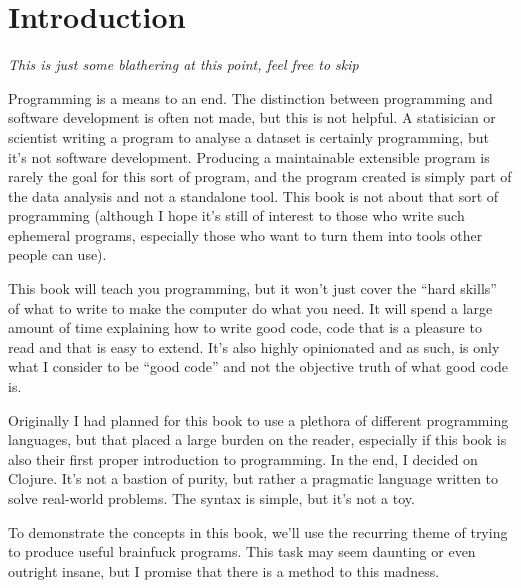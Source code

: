 \chapter{Introduction}

{\em This is just some blathering at this point, feel free to skip}

Programming is a means to an end. The distinction between programming
and software development is often not made, but this is not helpful.
A statisician or scientist writing a program to analyse a dataset is
certainly programming, but it's not software development.  Producing a
maintainable extensible program is rarely the goal for this sort of
program, and the program created is simply part of the data analysis
and not a standalone tool. This book is not about that sort of
programming (although I hope it's still of interest to those who write
such ephemeral programs, especially those who want to turn them into
tools other people can use).

This book will teach you programming, but it won't just cover the
``hard skills'' of what to write to make the computer do what you
need.  It will spend a large amount of time explaining how to write
good code, code that is a pleasure to read and that is easy to extend.
It's also highly opinionated and as such, is only what I consider to
be ``good code'' and not the objective truth of what good code is.

Originally I had planned for this book to use a plethora of different
programming languages, but that placed a large burden on the reader,
especially if this book is also their first proper introduction to
programming.
In the end, I decided on Clojure. It's not a bastion of purity, but
rather a pragmatic language written to solve real-world problems.  The
syntax is simple, but it's not a toy.

To demonstrate the concepts in this book, we'll use the recurring
theme of trying to produce useful brainfuck programs.  This task may
seem daunting or even outright insane, but I promise that there is a
method to this madness.

